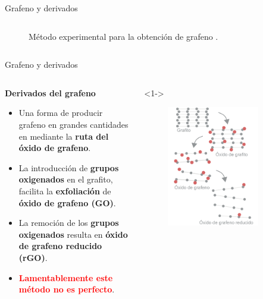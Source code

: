 \documentclass[aspectratio=169]{beamer}
\begin{document}
\begin{frame}{Grafeno y derivados}
\begin{columns}
\begin{column}{0.4\textwidth}
\begin{onlyenv}
\begin{figure}
						\caption{Método experimental para la obtención de grafeno \citep{Novoselov2004}.}
					\end{figure}
				\end{onlyenv}
			\end{column}
		\end{columns}
	\end{frame}

	\begin{frame}{Grafeno y derivados}
		\begin{columns}
			\begin{column}{0.6\textwidth}
				\only<1->\textbf{Derivados del grafeno}
				\begin{itemize}[<+(1)->]
					\item Una forma de producir grafeno en grandes cantidades en mediante la \textbf{ruta del óxido de grafeno}.
					\item La introducción de \textcolor{red_oxigen}{\textbf{grupos oxigenados}} en el grafito, facilita la \textbf{exfoliación} de \textbf{óxido de grafeno (GO)}.
					\item La remoción de los \textcolor{red_oxigen}{\textbf{grupos oxigenados}} resulta en \textbf{óxido de grafeno reducido (rGO)}.
					\item[] \textcolor{red}{\textbf{Lamentablemente este método no es perfecto}}.
				\end{itemize}
			\end{column}
			\begin{column}{0.4\textwidth}
				\begin{onlyenv}<1->
					\begin{figure}
						\includegraphics[width=0.8\textwidth]{graphiteToRGO_stack.pdf}

\end{figure}
\end{onlyenv}
\end{column}
\end{columns}
\end{frame}
\end{document}
